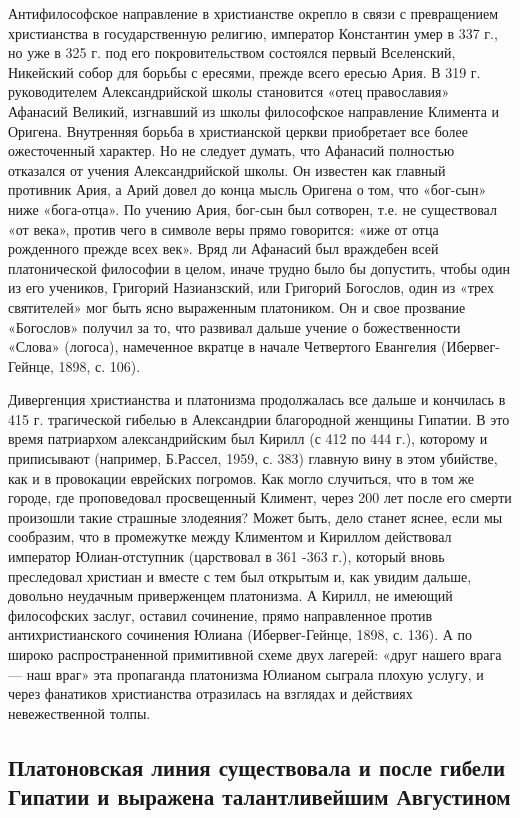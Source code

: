 Антифилософское направление в христианстве окрепло в связи с
превращением христианства в государственную религию, император
Константин умер в 337 г., но уже в 325 г. под его покровительством
состоялся первый Вселенский, Никейский собор для борьбы с ересями,
прежде всего ересью Ария. В 319 г. руководителем Александрийской школы
становится «отец православия» Афанасий Великий, изгнавший из школы
философское направление Климента и Оригена. Внутренняя борьба в
христианской церкви приобретает все более ожесточенный характер. Но не
следует думать, что Афанасий полностью отказался от учения
Александрийской школы. Он известен как главный противник Ария, а Арий
довел до конца мысль Оригена о том, что «бог-сын» ниже «бога-отца». По
учению Ария, бог-сын был сотворен, т.е. не существовал «от века»,
против чего в символе веры прямо говорится: «иже от отца рожденного
прежде всех век». Вряд ли Афанасий был враждебен всей платонической
философии в целом, иначе трудно было бы допустить, чтобы один из его
учеников, Григорий Назианзский, или Григорий Богослов, один из «трех
святителей» мог быть ясно выраженным платоником. Он и свое прозвание
«Богослов» получил за то, что развивал дальше учение о божественности
«Слова» (логоса), намеченное вкратце в начале Четвертого Евангелия
(Ибервег-Гейнце, 1898, с. 106).

Дивергенция христианства и платонизма продолжалась все дальше и
кончилась в 415 г. трагической гибелью в Александрии благородной
женщины Гипатии. В это время патриархом александрийским был Кирилл (с
412 по 444 г.), которому и приписывают (например, Б.Рассел, 1959, с.
383) главную вину в этом убийстве, как и в провокации еврейских
погромов. Как могло случиться, что в том же городе, где проповедовал
просвещенный Климент, через 200 лет после его смерти произошли такие
страшные злодеяния? Может быть, дело станет яснее, если мы сообразим,
что в промежутке между Климентом и Кириллом действовал император
Юлиан-отступник (царствовал в 361 -363 г.), который вновь преследовал
христиан и вместе с тем был открытым и, как увидим дальше, довольно
неудачным приверженцем платонизма. А Кирилл, не имеющий философских
заслуг, оставил сочинение, прямо направленное против антихристианского
сочинения Юлиана (Ибервег-Гейнце, 1898, с. 136). А по широко
распространенной примитивной схеме двух лагерей: «друг нашего врага
--- наш враг» эта пропаганда платонизма Юлианом сыграла плохую услугу,
и через фанатиков христианства отразилась на взглядах и действиях
невежественной толпы.

\subsection{Платоновская линия существовала и после гибели Гипатии и
выражена талантливейшим Августином}

